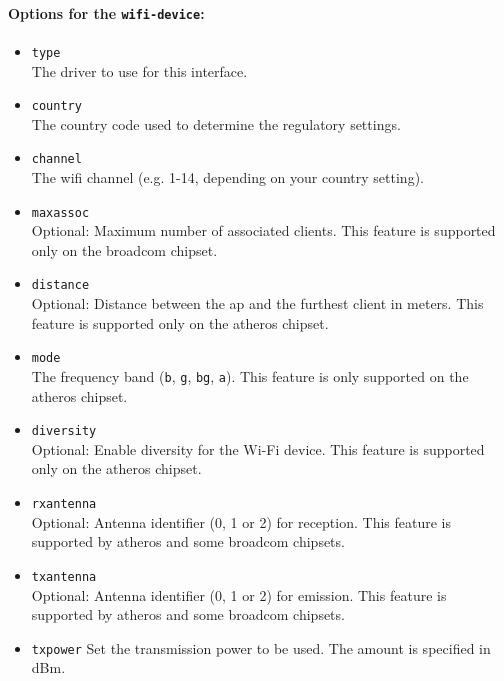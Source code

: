 \paragraph{Options for the \texttt{wifi-device}:}

\begin{itemize}
    \item \texttt{type} \\
        The driver to use for this interface.
	
    \item \texttt{country} \\
        The country code used to determine the regulatory settings.

    \item \texttt{channel} \\
        The wifi channel (e.g. 1-14, depending on your country setting).

    \item \texttt{maxassoc} \\
        Optional: Maximum number of associated clients. This feature is supported only on the broadcom chipset.

    \item \texttt{distance} \\
	Optional: Distance between the ap and the furthest client in meters. This feature is supported only on the atheros chipset.

	\item \texttt{mode} \\
		The frequency band (\texttt{b}, \texttt{g}, \texttt{bg}, \texttt{a}). This feature is only supported on the atheros chipset.

    \item \texttt{diversity} \\
	Optional: Enable diversity for the Wi-Fi device. This feature is supported only on the atheros chipset.

    \item \texttt{rxantenna} \\
	Optional: Antenna identifier (0, 1 or 2) for reception. This feature is supported by atheros and some broadcom chipsets.

    \item \texttt{txantenna} \\
	Optional: Antenna identifier (0, 1 or 2) for emission. This feature is supported by atheros and some broadcom chipsets.

    \item \texttt{txpower}
	Set the transmission power to be used. The amount is specified in dBm.

\end{itemize}

